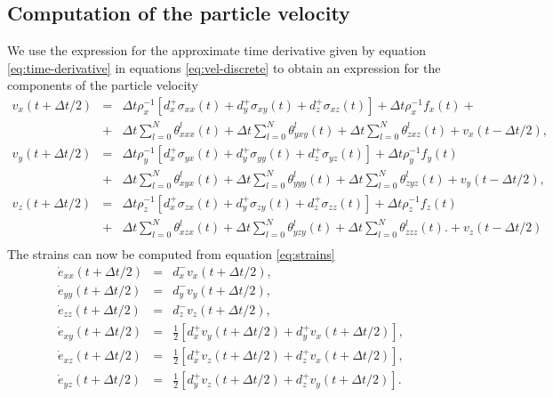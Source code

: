 \documentclass[11pt]{article}
\begin{document}
\subsection*{Computation of the particle velocity}
We use the expression for the approximate time derivative given by equation \eqref{eq:time-derivative}
in equations \eqref{eq:vel-discrete} to obtain an expression for the components of the particle velocity
\begin{eqnarray}
v_x(t+\Delta t/2) & = & \Delta t\rho_x^{-1}\left[d^+_x \sigma_{xx}(t) +d^+_y \sigma_{xy}(t) +d^+_z \sigma_{xz}(t)\right] 
                         + \Delta t \rho_x^{-1}f_x(t) +\nonumber\\ 
           & + & \Delta t \sum_{l=0}^N\theta^l_{xxx}(t) +  \Delta t \sum_{l=0}^N\theta^l_{yxy}(t) +  \Delta t \sum_{l=0}^N\theta^l_{zxz}(t)
                   +v_x(t-\Delta t/2),\nonumber\\
v_y(t+\Delta t/2) & = & \Delta t\rho_y^{-1}\left[d^+_x \sigma_{yx}(t) +d^+_y \sigma_{yy}(t) +d^+_z \sigma_{yz}(t)\right] 
                         + \Delta t \rho_y^{-1}f_y(t)\nonumber\\
           & + & \Delta t\sum_{l=0}^N\theta^l_{xyx}(t) +  \Delta t\sum_{l=0}^N\theta^l_{yyy}(t) +  \Delta t\sum_{l=0}^N\theta^l_{zyz}(t)
                        + v_y(t-\Delta t/2), \nonumber\\ 
v_z(t+\Delta t/2) & = & \Delta t \rho_z^{-1}\left[d^+_x \sigma_{zx}(t) +d^+_y \sigma_{zy}(t) +d^+_z \sigma_{zz}(t)\right] 
                        + \Delta t \rho_z^{-1}f_z(t)\nonumber\\  
           & + & \Delta t\sum_{l=0}^N\theta^l_{xzx}(t) +  \Delta t\sum_{l=0}^N\theta^l_{yzy}(t) +  \Delta t\sum_{l=0}^N\theta^l_{zzz}(t)\nonumber.
                       +v_z(t-\Delta t/2) \\  
\end{eqnarray}
The strains can now be computed from equation \eqref{eq:strains}
\begin{eqnarray}
    \dot{e}_{xx}(t+\Delta t/2) & = & d^-_x v_x(t+\Delta t/2), \nonumber\\
    \dot{e}_{yy}(t+\Delta t/2) & = & d^-_y v_y(t+\Delta t/2), \nonumber\\
    \dot{e}_{zz}(t+\Delta t/2) & = & d^-_z v_z(t+\Delta t/2), \nonumber\\
    \dot{e}_{xy}(t+\Delta t/2) & = & \frac{1}{2}\left[d^+_x v_y(t+\Delta t/2) + d^+_y v_x(t+\Delta t/2)\right],\nonumber \\
    \dot{e}_{xz}(t+\Delta t/2) & = & \frac{1}{2}\left[d^+_x v_z(t+\Delta t/2) + d^+_z v_x(t+\Delta t/2)\right],\nonumber \\
    \dot{e}_{yz}(t+\Delta t/2) & = & \frac{1}{2}\left[d^+_y v_z(t+\Delta t/2) +d^+_z v_y(t+\Delta t/2)\right]. \nonumber\\
\end{eqnarray}
\end{document}
